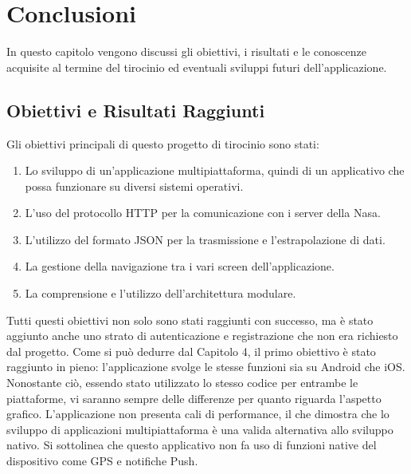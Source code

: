 \chapter*{Conclusioni}
\markboth{}{}

In questo capitolo vengono discussi gli obiettivi, i risultati e le conoscenze acquisite al termine del tirocinio ed eventuali sviluppi futuri dell'applicazione.

\section{Obiettivi e Risultati Raggiunti}
Gli obiettivi principali di questo progetto di tirocinio sono stati:
\begin{enumerate}
    \item Lo sviluppo di un'applicazione multipiattaforma, quindi di un applicativo che possa funzionare su diversi sistemi operativi.
    \item L'uso del protocollo HTTP per la comunicazione con i server della Nasa.
    \item L'utilizzo del formato JSON per la trasmissione e l'estrapolazione di dati.
    \item La gestione della navigazione tra i vari screen dell'applicazione.
    \item La comprensione e l'utilizzo dell'architettura modulare.
\end{enumerate}

Tutti questi obiettivi non solo sono stati raggiunti con successo, ma \`e stato aggiunto anche uno strato di autenticazione e registrazione che non era richiesto dal progetto.
Come si pu\`o dedurre dal Capitolo 4, il primo obiettivo \`e stato raggiunto in pieno: l'applicazione svolge le stesse funzioni sia su Android che iOS. Nonostante ci\`o, essendo stato
utilizzato lo stesso codice per entrambe le piattaforme, vi saranno sempre delle differenze per quanto riguarda l'aspetto grafico. L'applicazione non presenta
cali di performance, il che dimostra che lo sviluppo di applicazioni multipiattaforma \`e una valida alternativa allo sviluppo nativo.
Si sottolinea che questo applicativo non fa uso di funzioni native del dispositivo come GPS e notifiche Push.

